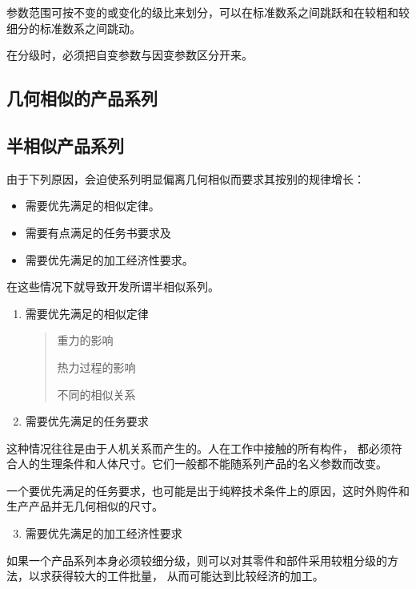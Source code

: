 \documentclass[letterpaper,10pt,english]{sphinxmanual}
\begin{document}
参数范围可按不变的或变化的级比来划分，可以在标准数系之间跳跃和在较粗和较细分的标准数系之间跳动。

在分级时，必须把自变参数与因变参数区分开来。


\subsection{几何相似的产品系列}
\label{unit7:id6}

\subsection{半相似产品系列}
\label{unit7:id7}
由于下列原因，会迫使系列明显偏离几何相似而要求其按别的规律增长：
\begin{itemize}
\item {} 
需要优先满足的相似定律。

\item {} 
需要有点满足的任务书要求及

\item {} 
需要优先满足的加工经济性要求。

\end{itemize}

在这些情况下就导致开发所谓半相似系列。
\begin{enumerate}
\item {} 
需要优先满足的相似定律
\begin{quote}

重力的影响

热力过程的影响

不同的相似关系
\end{quote}

\item {} 
需要优先满足的任务要求

\end{enumerate}

这种情况往往是由于人机关系而产生的。人在工作中接触的所有构件，
都必须符合人的生理条件和人体尺寸。它们一般都不能随系列产品的名义参数而改变。

一个要优先满足的任务要求，也可能是出于纯粹技术条件上的原因，这时外购件和生产产品并无几何相似的尺寸。
\begin{enumerate}
\setcounter{enumi}{2}
\item {} 
需要优先满足的加工经济性要求

\end{enumerate}

如果一个产品系列本身必须较细分级，则可以对其零件和部件采用较粗分级的方法，以求获得较大的工件批量，
从而可能达到比较经济的加工。
\end{document}
